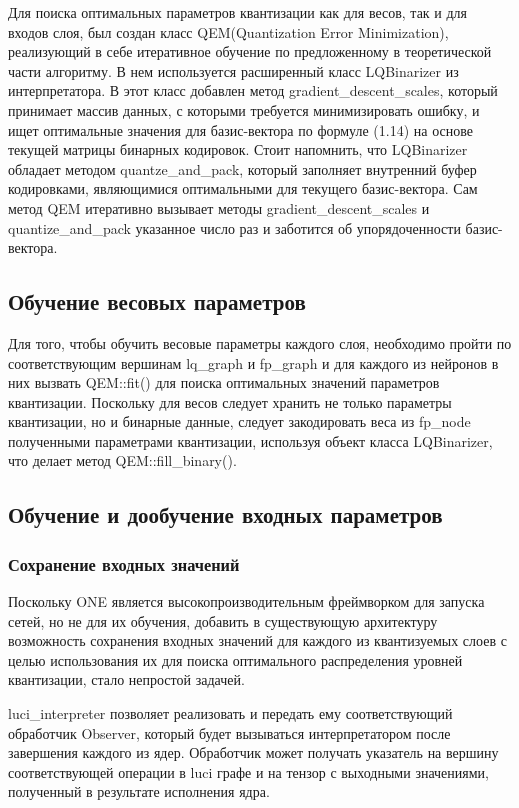 Для поиска оптимальных параметров квантизации как для весов, так и для входов слоя, был создан класс QEM(Quantization Error Minimization), реализующий в себе итеративное обучение по предложенному в теоретической части алгоритму. В нем используется расширенный класс LQBinarizer из интерпретатора. В этот класс добавлен метод gradient\_descent\_scales, который принимает массив данных, с которыми требуется минимизировать ошибку, и ищет оптимальные значения для базис-вектора по формуле (1.14) на основе текущей матрицы бинарных кодировок. Стоит напомнить, что LQBinarizer обладает методом quantze\_and\_pack, который заполняет внутренний буфер кодировками, являющимися оптимальными для текущего базис-вектора. Сам метод QEM итеративно вызывает методы gradient\_descent\_scales и quantize\_and\_pack указанное число раз и заботится об упорядоченности базис-вектора.

\subsection{Обучение весовых параметров}

Для того, чтобы обучить весовые параметры каждого слоя, необходимо пройти по соответствующим вершинам lq\_graph и fp\_graph и для каждого из нейронов в них вызвать QEM::fit() для поиска оптимальных значений параметров квантизации. Поскольку для весов следует хранить не только параметры квантизации, но и бинарные данные, следует закодировать веса из fp\_node полученными параметрами квантизации, используя объект класса LQBinarizer, что делает метод QEM::fill\_binary().

\subsection{Обучение и дообучение входных параметров}

\subsubsection{Сохранение входных значений}

Поскольку ONE является высокопроизводительным фреймворком для запуска сетей, но не для их обучения, добавить  в существующую архитектуру возможность сохранения входных значений для каждого из квантизуемых слоев с целью использования их для поиска оптимального распределения уровней квантизации, стало непростой задачей. 

luci\_interpreter позволяет реализовать и передать ему соответствующий обработчик Observer, который будет вызываться интерпретатором после завершения каждого из ядер. Обработчик может получать указатель на вершину соответствующей операции в luci графе и на тензор с выходными значениями, полученный в результате исполнения ядра.

